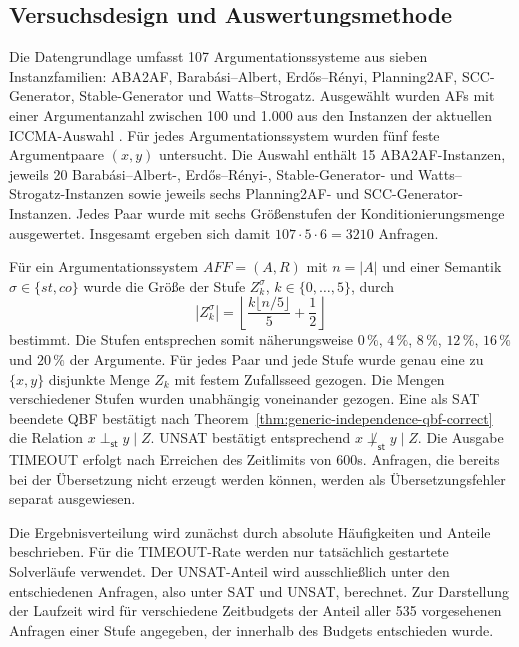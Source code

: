 \iffalse
\subsection{Versuchsdesign und Auswertungsmethode}
\label{subsec:empirical-stable-z-method}

Die Datengrundlage umfasst 107 Argumentationssysteme aus sieben
Instanzfamilien: ABA2AF, Barabási--Albert, Erdős--Rényi, Planning2AF,
SCC-Generator, Stable-Generator und Watts--Strogatz. Ausgewählt wurden AFs mit einer Argumentanzahl 
zwischen 100 und 1.000 aus 
den Instanzen der aktuellen ICCMA-Auswahl \cite{bistarelli:2025:iccma}.
Für jedes Argumentationssystem wurden fünf feste Argumentpaare \((x,y)\) untersucht.
Die Auswahl enthält 15 ABA2AF-Instanzen, jeweils 20
Barabási--Albert-, Erdős--Rényi-, Stable-Generator- und
Watts--Strogatz-Instanzen sowie jeweils sechs Planning2AF- und
SCC-Generator-Instanzen.
Jedes Paar wurde mit sechs Größenstufen der Konditionierungsmenge
ausgewertet. Insgesamt ergeben sich damit
\(107\cdot 5\cdot 6=3210\) Anfragen.

Für ein Argumentationssystem \(AF F =(A,R)\) mit \(n=|A|\) und einer Semantik \(\sigma \in \{st, co\}\) 
wurde die Größe der Stufe \(Z_k^{\sigma}\), \(k\in\{0,\ldots,5\}\), durch
\[
    |Z_k^{\sigma}|
    =
    \left\lfloor
        \frac{k\lfloor n/5\rfloor}{5}+\frac{1}{2}
    \right\rfloor
\]
bestimmt. Die Stufen entsprechen somit näherungsweise \(0\,\%\),
\(4\,\%\), \(8\,\%\), \(12\,\%\), \(16\,\%\) und \(20\,\%\) der Argumente.
Für jedes Paar und jede Stufe wurde genau
eine zu \(\{x,y\}\) disjunkte Menge \(Z_k\) mit festem Zufallsseed gezogen.
Die Mengen verschiedener Stufen wurden unabhängig voneinander gezogen.
Eine als SAT beendete QBF bestätigt nach
Theorem~\ref{thm:generic-independence-qbf-correct} die Relation
\(x\perp_{\mathsf{st}}y\mid Z\). UNSAT bestätigt entsprechend
\(x\not\perp_{\mathsf{st}}y\mid Z\). Die Ausgabe TIMEOUT erfolgt nach Erreichen des Zeitlimits von 600s. 
Anfragen, die bereits bei der Übersetzung nicht erzeugt werden können, werden als
Übersetzungsfehler separat ausgewiesen.

Die Ergebnisverteilung wird zunächst durch absolute Häufigkeiten und
Anteile beschrieben. Für die TIMEOUT-Rate werden nur tatsächlich gestartete
Solverläufe verwendet.
Der UNSAT-Anteil wird ausschließlich unter den entschiedenen Anfragen, also unter
SAT und UNSAT, berechnet. Zur Darstellung der Laufzeit wird für verschiedene
Zeitbudgets der Anteil aller 535 vorgesehenen Anfragen einer Stufe
angegeben, der innerhalb des Budgets entschieden wurde.

